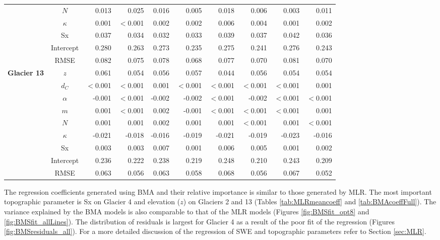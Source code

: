\documentclass{sfuthesis}
\begin{document}
\begin{table}
\begin{tabular}{ccrrrrrrrr}
 & $N$ & 0.013 & 0.025 & 0.016 & 0.005 & 0.018 & 0.006 & 0.003 & 0.011 \\
 & $\kappa$ & 0.001 & $<$0.001 & 0.002 & 0.002 & 0.006 & 0.004 & 0.001 & 0.002 \\
 & Sx & 0.037 & 0.034 & 0.032 & 0.033 & 0.039 & 0.037 & 0.042 & 0.036 \\
 & Intercept & 0.280 & 0.263 & 0.273 & 0.235 & 0.275 & 0.241 & 0.276 & 0.243 \\
 & RMSE & 0.082 & 0.075 & 0.078 & 0.068 & 0.077 & 0.070 & 0.081 & 0.070 \\ \hline
\multirow{9}{*}{\textbf{Glacier 13}} & $z$ & 0.061 & 0.054 & 0.056 & 0.057 & 0.044 & 0.056 & 0.054 & 0.054 \\
 & $d_C$ & $<$0.001 & $<$0.001 & 0.001 & $<$0.001 & $<$0.001 & $<$0.001 & $<$0.001 & 0.001 \\
 & $\alpha$ & -0.001 & $<$0.001 & -0.002 & -0.002 & $<$0.001 & -0.002 & $<$0.001 & $<$0.001 \\
 & $m$ & 0.001 & $<$0.001 & 0.002 & -0.001 & $<$0.001 & $<$0.001 & $<$0.001 & 0.001 \\
 & $N$ & 0.001 & 0.001 & 0.002 & 0.001 & 0.001 & $<$0.001 & 0.001 & $<$0.001 \\
 & $\kappa$ & -0.021 & -0.018 & -0.016 & -0.019 & -0.021 & -0.019 & -0.023 & -0.016 \\
 & Sx & 0.003 & 0.003 & 0.007 & 0.001 & 0.006 & 0.005 & 0.001 & 0.002 \\
 & Intercept & 0.236 & 0.222 & 0.238 & 0.219 & 0.248 & 0.210 & 0.243 & 0.209 \\
 & RMSE & 0.063 & 0.056 & 0.063 & 0.058 & 0.068 & 0.056 & 0.067 & 0.052
\end{tabular}
\end{table}

The regression coefficients generated using BMA and their relative importance is similar to those generated by MLR. The most important topographic parameter is Sx on Glacier 4 and elevation ($z$) on Glaciers 2 and 13 (Tables \ref{tab:MLRmeancoeff} and \ref{tab:BMAcoeffFull}). The variance explained by the BMA models is also comparable to that of the MLR models (Figures \ref{fig:BMSfit_opt8} and \ref{fig:BMSfit_allLines}). The distribution of residuals is largest for Glacier 4 as a result of the poor fit of the regression (Figures \ref{fig:BMSresiduals_all}). For a more detailed discussion of the regression of SWE and topographic parameters refer to Section \ref{sec:MLR}.
\end{document}
